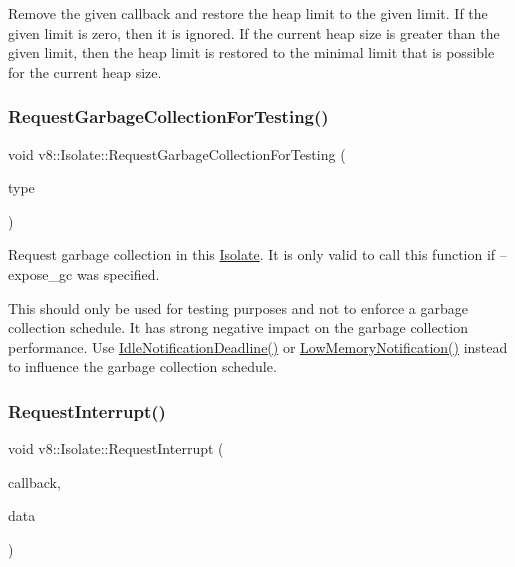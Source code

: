 Remove the given callback and restore the heap limit to the given limit. If the given limit is zero, then it is ignored. If the current heap size is greater than the given limit, then the heap limit is restored to the minimal limit that is possible for the current heap size. \mbox{\label{classv8_1_1Isolate_a59fe893ed7e9df52cef2d59b2d98ab23}} 
\subsubsection{\texorpdfstring{Request\+Garbage\+Collection\+For\+Testing()}{RequestGarbageCollectionForTesting()}}
{\footnotesize\ttfamily void v8\+::\+Isolate\+::\+Request\+Garbage\+Collection\+For\+Testing (\begin{DoxyParamCaption}\item[{\mbox{\hyperlink{classv8_1_1Isolate_a5ae00cc99d8aca148c6f5f9698c432c9}{Garbage\+Collection\+Type}}}]{type }\end{DoxyParamCaption})}

Request garbage collection in this \mbox{\hyperlink{classv8_1_1Isolate}{Isolate}}. It is only valid to call this function if --expose\+\_\+gc was specified.

This should only be used for testing purposes and not to enforce a garbage collection schedule. It has strong negative impact on the garbage collection performance. Use \mbox{\hyperlink{classv8_1_1Isolate_aba794ed25d4fa8780b3a07c66a5e5d4a}{Idle\+Notification\+Deadline()}} or \mbox{\hyperlink{classv8_1_1Isolate_aaf446f4877e4707a93d2c406fffd9fd6}{Low\+Memory\+Notification()}} instead to influence the garbage collection schedule. \mbox{\label{classv8_1_1Isolate_a971b6094ecc6c7f55eb6f58a71a8afd3}} 
\subsubsection{\texorpdfstring{Request\+Interrupt()}{RequestInterrupt()}}
{\footnotesize\ttfamily void v8\+::\+Isolate\+::\+Request\+Interrupt (\begin{DoxyParamCaption}\item[{Interrupt\+Callback}]{callback,  }\item[{void $\ast$}]{data }\end{DoxyParamCaption})}

